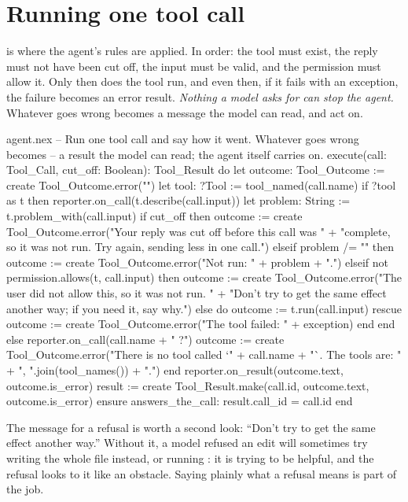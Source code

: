 \section{Running one tool call}

 is where the agent's rules are applied. In order: the tool
must exist, the reply must not have been cut off, the input must be valid,
and the permission must allow it. Only then does the tool run, and even
then, if it fails with an exception, the failure becomes an error result.
\emph{Nothing a model asks for can stop the agent.} Whatever goes wrong
becomes a message the model can read, and act on.

\begin{continued}{agent.nex}
  -- Run one tool call and say how it went. Whatever goes wrong becomes
  -- a result the model can read; the agent itself carries on.
  execute(call: Tool_Call, cut_off: Boolean): Tool_Result do
    let outcome: Tool_Outcome := create Tool_Outcome.error("")
    let tool: ?Tool := tool_named(call.name)
    if ?tool as t then
      reporter.on_call(t.describe(call.input))
      let problem: String := t.problem_with(call.input)
      if cut_off then
        outcome := create Tool_Outcome.error("Your reply was cut off before this call was "
          + "complete, so it was not run. Try again, sending less in one call.")
      elseif problem /= "" then
        outcome := create Tool_Outcome.error("Not run: " + problem + ".")
      elseif not permission.allows(t, call.input) then
        outcome := create Tool_Outcome.error("The user did not allow this, so it was not run. "
          + "Don't try to get the same effect another way; if you need it, say why.")
      else
        do
          outcome := t.run(call.input)
        rescue
          outcome := create Tool_Outcome.error("The tool failed: " + exception)
        end
      end
    else
      reporter.on_call(call.name + " ?")
      outcome := create Tool_Outcome.error("There is no tool called `" + call.name
        + "`. The tools are: " + ", ".join(tool_names()) + ".")
    end
    reporter.on_result(outcome.text, outcome.is_error)
    result := create Tool_Result.make(call.id, outcome.text, outcome.is_error)
  ensure
    answers_the_call: result.call_id = call.id
  end
\end{continued}

The message for a refusal is worth a second look: ``Don't try to get the
same effect another way.'' Without it, a model refused an edit will
sometimes try writing the whole file instead, or running : it is
trying to be helpful, and the refusal looks to it like an obstacle. Saying
plainly what a refusal means is part of the job.

